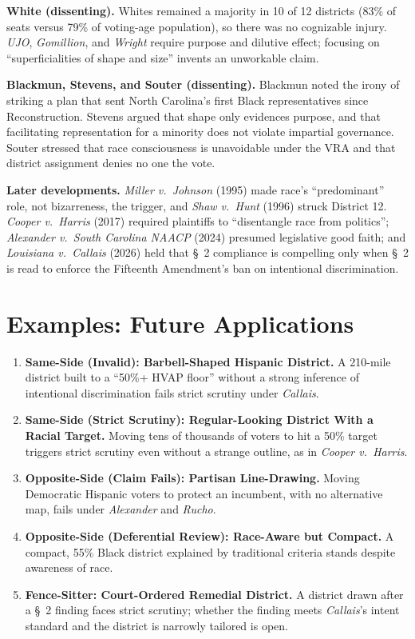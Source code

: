 \documentclass[12pt]{article}
\begin{document}
\textbf{White (dissenting).} Whites remained a majority in 10 of 12 districts (83\% of seats versus 79\% of voting-age population), so there was no cognizable injury. \textit{UJO}, \textit{Gomillion}, and \textit{Wright} require purpose and dilutive effect; focusing on ``superficialities of shape and size'' invents an unworkable claim.

\textbf{Blackmun, Stevens, and Souter (dissenting).} Blackmun noted the irony of striking a plan that sent North Carolina's first Black representatives since Reconstruction. Stevens argued that shape only evidences purpose, and that facilitating representation for a minority does not violate impartial governance. Souter stressed that race consciousness is unavoidable under the VRA and that district assignment denies no one the vote.

\textbf{Later developments.} \textit{Miller v.\ Johnson} (1995) made race's ``predominant'' role, not bizarreness, the trigger, and \textit{Shaw v.\ Hunt} (1996) struck District 12. \textit{Cooper v.\ Harris} (2017) required plaintiffs to ``disentangle race from politics''; \textit{Alexander v.\ South Carolina NAACP} (2024) presumed legislative good faith; and \textit{Louisiana v.\ Callais} (2026) held that \S\ 2 compliance is compelling only when \S\ 2 is read to enforce the Fifteenth Amendment's ban on intentional discrimination.

\section{Examples: Future Applications}

\begin{enumerate}
\item \textbf{Same-Side (Invalid): Barbell-Shaped Hispanic District.} A 210-mile district built to a ``50\%+ HVAP floor'' without a strong inference of intentional discrimination fails strict scrutiny under \textit{Callais}.
\item \textbf{Same-Side (Strict Scrutiny): Regular-Looking District With a Racial Target.} Moving tens of thousands of voters to hit a 50\% target triggers strict scrutiny even without a strange outline, as in \textit{Cooper v.\ Harris}.
\item \textbf{Opposite-Side (Claim Fails): Partisan Line-Drawing.} Moving Democratic Hispanic voters to protect an incumbent, with no alternative map, fails under \textit{Alexander} and \textit{Rucho}.
\item \textbf{Opposite-Side (Deferential Review): Race-Aware but Compact.} A compact, 55\% Black district explained by traditional criteria stands despite awareness of race.
\item \textbf{Fence-Sitter: Court-Ordered Remedial District.} A district drawn after a \S\ 2 finding faces strict scrutiny; whether the finding meets \textit{Callais}'s intent standard and the district is narrowly tailored is open.
\end{enumerate}
\end{document}
